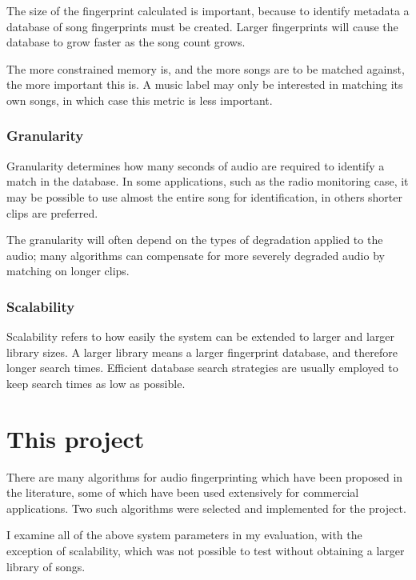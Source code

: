 \documentclass[12pt,a4paper,twoside,openright]{report}
\begin{document}
The size of the fingerprint calculated is important, because to identify metadata a database of song fingerprints must be created. Larger fingerprints will cause the database to grow faster as the song count grows.

The more constrained memory is, and the more songs are to be matched against, the more important this is. A music label may only be interested in matching its own songs, in which case this metric is less important.


\subsubsection{Granularity}

Granularity determines how many seconds of audio are required to identify a match in the database. In some applications, such as the radio monitoring case, it may be possible to use almost the entire song for identification, in others shorter clips are preferred.

The granularity will often depend on the types of degradation applied to the audio; many algorithms can compensate for more severely degraded audio by matching on longer clips.

\subsubsection{Scalability}

Scalability refers to how easily the system can be extended to larger and larger library sizes. A larger library means a larger fingerprint database, and therefore longer search times. Efficient database search strategies are usually employed to keep search times as low as possible.


\section{This project}

There are many algorithms for audio fingerprinting which have been proposed in the literature, some of which have been used extensively for commercial applications. Two such algorithms were selected and implemented for the project.

I examine all of the above system parameters in my evaluation, with the exception of scalability, which was not possible to test without obtaining a larger library of songs.

\end{document}
